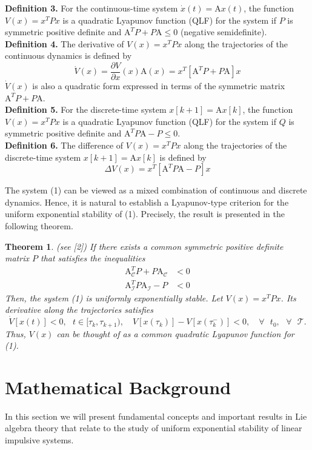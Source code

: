 \documentclass[11pt,a4paper]{article}
\newtheorem{theorem}{Theorem}
\begin{document}
\textbf{Definition 3.} For the continuous-time system $\dot{x}(t) = \mathrm{A}x(t)$,
the function $V(x) = x^TPx$ is a quadratic Lyapunov function (QLF) for the system if $P$ is symmetric positive definite and $\mathrm{A}^TP + P\mathrm{A} \leq 0$ (negative semidefinite).\\

\textbf{Definition 4.} The derivative of $V(x) = x^TPx$ along the trajectories of the continuous dynamics is defined by
$$
\dot{V}(x) = \frac{\partial V}{\partial x}(x)\mathrm{A}(x) = x^T[\mathrm{A}^TP + P\mathrm{A}]x
$$
$\dot{V}(x)$ is also a quadratic form expressed in terms of the symmetric matrix $\mathrm{A}^TP + P\mathrm{A}$.\\

\textbf{Definition 5.} For the discrete-time system $x[k+1] = \mathrm{A}x[k]$,
the function $V(x) = x^TPx$ is a quadratic Lyapunov function (QLF) for the system if $Q$ is symmetric positive definite and $\mathrm{A}^TP\mathrm{A} - P \leq 0$.\\

\textbf{Definition 6.} The difference of $V(x) = x^TPx$ along the trajectories of the discrete-time system
$x[k+1] = \mathrm{A}x[k]$ is defined by
$$
\Delta V(x) = x^T[\mathrm{A}^TP\mathrm{A} - P]x
$$
 
The system (1) can be viewed as a mixed combination of continuous and discrete dynamics. Hence, it is natural to establish a Lyapunov-type criterion for the uniform exponential stability of (1). Precisely, the result is presented in the following theorem.
	
\begin{theorem}(see [2]) If there exists a common symmetric positive definite matrix $P$ that satisfies the inequalities 
	\begin{align}
	\mathrm{A}^T_{\mathcal{C}}P + P\mathrm{A}_{\mathcal{C}} &< 0  \\
	\mathrm{A}^T_{\mathcal{I}}P\mathrm{A}_{\mathcal{I}} - P &< 0 \nonumber
	\end{align}
	Then, the system (1) is uniformly exponentially stable. Let $V(x)= x^TPx$. Its derivative along the trajectories satisfies
	$$\dot{V}[x(t)] < 0, \text{ } t \in [\tau_k, \tau_{k+1}), \quad  V[x(\tau_k)]- V[x(\tau_k^-)] < 0, \quad \forall \text{ } t_0, \text{ } \forall \text{ }\mathcal{T}. $$
	 Thus, $V(x)$ can be thought of as a common quadratic Lyapunov function for (1).\\
\end{theorem}

%
%
\section{Mathematical Background}
\qquad In this section we will present fundamental concepts and important results in Lie algebra theory that relate to the study of uniform exponential stability of linear impulsive systems.
\end{document}
